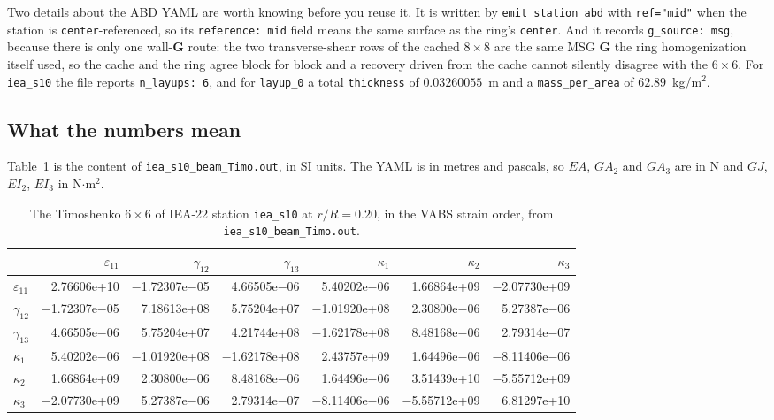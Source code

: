 Two details about the ABD YAML are worth knowing before you reuse it. It is
written by \texttt{emit\_station\_abd} with \texttt{ref="mid"} when the station
is \texttt{center}-referenced, so its \texttt{reference: mid} field means the
same surface as the ring's \texttt{center}. And it records
\texttt{g\_source: msg}, because there is only one wall-$\mathbf{G}$ route:
the two transverse-shear rows of the cached $8\times8$ are the same MSG
$\mathbf{G}$ the ring homogenization itself used, so the cache and the ring
agree block for block and a recovery driven from the cache cannot silently
disagree with the $6\times6$. For \texttt{iea\_s10} the file reports
\texttt{n\_layups: 6}, and for \texttt{layup\_0} a total \texttt{thickness} of
$0.03260055$~m and a \texttt{mass\_per\_area} of $62.89$~kg/m$^2$.

\subsection*{What the numbers mean}

Table~\ref{tab:windio:c6} is the content of \texttt{iea\_s10\_beam\_Timo.out},
in SI units. The YAML is in metres and pascals, so $EA$, $GA_2$ and $GA_3$ are
in N and $GJ$, $EI_2$, $EI_3$ in N$\cdot$m$^2$.

\begin{table}[htbp]
\centering
\footnotesize
\caption{The Timoshenko $6\times6$ of IEA-22 station \texttt{iea\_s10} at $r/R = 0.20$,
         in the VABS strain order, from \texttt{iea\_s10\_beam\_Timo.out}.}
\label{tab:windio:c6}
\setlength{\tabcolsep}{4pt}
\begin{tabular}{lrrrrrr}
\toprule
 & $\varepsilon_{11}$ & $\gamma_{12}$ & $\gamma_{13}$ & $\kappa_1$ & $\kappa_2$ & $\kappa_3$ \\
\midrule
$\varepsilon_{11}$ & 2.76606e+10 & $-$1.72307e$-$05 & 4.66505e$-$06 & 5.40202e$-$06 & 1.66864e+09 & $-$2.07730e+09 \\
$\gamma_{12}$ & $-$1.72307e$-$05 & 7.18613e+08 & 5.75204e+07 & $-$1.01920e+08 & 2.30800e$-$06 & 5.27387e$-$06 \\
$\gamma_{13}$ & 4.66505e$-$06 & 5.75204e+07 & 4.21744e+08 & $-$1.62178e+08 & 8.48168e$-$06 & 2.79314e$-$07 \\
$\kappa_1$ & 5.40202e$-$06 & $-$1.01920e+08 & $-$1.62178e+08 & 2.43757e+09 & 1.64496e$-$06 & $-$8.11406e$-$06 \\
$\kappa_2$ & 1.66864e+09 & 2.30800e$-$06 & 8.48168e$-$06 & 1.64496e$-$06 & 3.51439e+10 & $-$5.55712e+09 \\
$\kappa_3$ & $-$2.07730e+09 & 5.27387e$-$06 & 2.79314e$-$07 & $-$8.11406e$-$06 & $-$5.55712e+09 & 6.81297e+10 \\
\bottomrule
\end{tabular}
\end{table}

